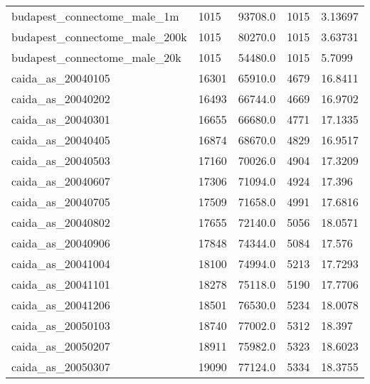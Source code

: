 \begin{longtable}{lllll}
 budapest\_connectome\_male\_1m                        & 1015       & 93708.0     & 1015  & 3.13697    \\
 budapest\_connectome\_male\_200k                      & 1015       & 80270.0     & 1015  & 3.63731    \\
 budapest\_connectome\_male\_20k                       & 1015       & 54480.0     & 1015  & 5.7099     \\
 caida\_as\_20040105                                  & 16301      & 65910.0     & 4679  & 16.8411    \\
 caida\_as\_20040202                                  & 16493      & 66744.0     & 4669  & 16.9702    \\
 caida\_as\_20040301                                  & 16655      & 66680.0     & 4771  & 17.1335    \\
 caida\_as\_20040405                                  & 16874      & 68670.0     & 4829  & 16.9517    \\
 caida\_as\_20040503                                  & 17160      & 70026.0     & 4904  & 17.3209    \\
 caida\_as\_20040607                                  & 17306      & 71094.0     & 4924  & 17.396     \\
 caida\_as\_20040705                                  & 17509      & 71658.0     & 4991  & 17.6816    \\
 caida\_as\_20040802                                  & 17655      & 72140.0     & 5056  & 18.0571    \\
 caida\_as\_20040906                                  & 17848      & 74344.0     & 5084  & 17.576     \\
 caida\_as\_20041004                                  & 18100      & 74994.0     & 5213  & 17.7293    \\
 caida\_as\_20041101                                  & 18278      & 75118.0     & 5190  & 17.7706    \\
 caida\_as\_20041206                                  & 18501      & 76530.0     & 5234  & 18.0078    \\
 caida\_as\_20050103                                  & 18740      & 77002.0     & 5312  & 18.397     \\
 caida\_as\_20050207                                  & 18911      & 75982.0     & 5323  & 18.6023    \\
 caida\_as\_20050307                                  & 19090      & 77124.0     & 5334  & 18.3755    \\

\end{longtable}
